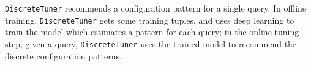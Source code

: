  \texttt{DiscreteTuner} recommends a configuration pattern for a single query.  In offline training,  \texttt{DiscreteTuner} gets some training tuples, and uses deep learning to train the model which estimates a pattern for each query; in the online tuning step, given a query, \texttt{DiscreteTuner} uses the trained model to recommend the discrete configuration patterns.


\fi









